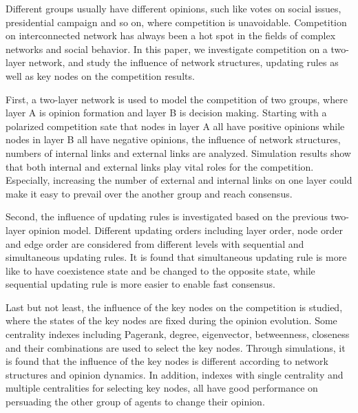 
\begin{bigabstract}
	
Different groups usually have different opinions, such like votes on social issues, presidential campaign and so on, where competition is unavoidable. Competition on interconnected network has always been a hot spot in the fields of complex networks and social behavior.  In this paper, we investigate competition on a two-layer network, and study the influence of network structures, updating rules as well as key nodes on the competition results.

First, a two-layer network is used to model the competition of two groups, where layer A is opinion formation and layer B is decision making. Starting with a polarized competition sate that nodes in layer A all have positive opinions while nodes in layer B all have negative opinions, the influence of network structures, numbers of internal links and external links are analyzed.  Simulation results show that both internal and external links play vital roles for the competition. Especially, increasing the number of external and internal links on one layer could make it easy to prevail over the another group and reach consensus.

Second, the influence of updating rules is investigated based on the previous two-layer opinion model. Different updating orders including layer order, node order and edge order are considered from different levels with sequential and simultaneous updating rules. It is found that simultaneous updating rule is more like to have coexistence state and be changed to the opposite state, while sequential updating rule is more easier to enable fast consensus.

Last but not least, the influence of the key nodes on the competition is studied, where the states of the key nodes are fixed during the opinion evolution. Some centrality indexes including Pagerank, degree, eigenvector, betweenness, closeness and their combinations are used to select the key nodes. Through simulations, it is found that the influence of the key nodes is different according to network structures and opinion dynamics. In addition, indexes with single centrality and multiple centralities for selecting key nodes, all have good performance on persuading the other group of agents to change their opinion.\\ \\ 

\end{bigabstract}